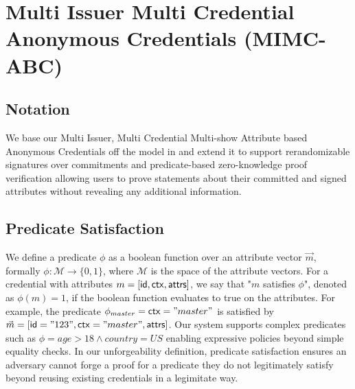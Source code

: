 \section{Multi Issuer Multi Credential Anonymous Credentials (MIMC-ABC)}\label{sec:mimc}


\subsection{Notation}
We base our Multi Issuer, Multi Credential Multi-show Attribute based Anonymous Credentials off the model in \cite{fuchsbauer_structure-preserving_2019} and extend it to support rerandomizable signatures over commitments and predicate-based zero-knowledge proof verification allowing users to prove statements about their committed and signed attributes without revealing any additional information.

\subsection{Predicate Satisfaction}
We define a predicate $\phi$ as a boolean function over an attribute vector $\vec{m}$, formally  $\phi: \mathcal{M} \rightarrow \{0,1\}$, where $\mathcal{M}$ is the space of the attribute vectors. 
For a credential with attributes $m = [\mathsf{id}, \mathsf{ctx}, \mathsf{attrs}]$, we say that "$m$ satisfies $\phi$", denoted as $\phi(m) = 1$, if the boolean function evaluates to true on the attributes.
For example, the predicate $\phi_{master} = \mathsf{ctx} = "master"$ is satisfied by $\vec{m} = [\mathsf{id}="123", \mathsf{ctx}="master", \mathsf{attrs}]$. Our system supports complex predicates such as $\phi = age > 18 \wedge country = US$ enabling expressive policies beyond simple equality checks. In our unforgeability definition, predicate satisfaction ensures an adversary cannot forge a proof for a predicate they do not legitimately satisfy beyond reusing existing credentials in a legimitate way.

